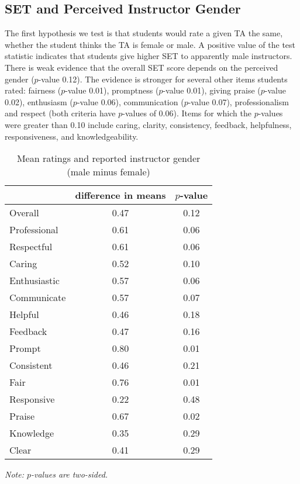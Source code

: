 \documentclass[12pt]{article}
\newcommand{\todo}[1]{{\color{red}{TO DO: \sc #1}}}
\begin{document}
\subsection{SET and Perceived Instructor Gender}
\todo{make sure the category names make sense in the prose}
The first hypothesis we test is that students would rate a given TA the same,
whether the student thinks the TA is female or male. 
A positive value of the test statistic indicates that students give higher SET
to apparently male instructors.
There is weak evidence that the overall SET score depends on the perceived gender ($p$-value 0.12). 
The evidence is stronger for several other items students rated: fairness ($p$-value 0.01), 
promptness ($p$-value 0.01), giving praise ($p$-value 0.02), 
enthusiasm ($p$-value 0.06), communication ($p$-value 0.07), professionalism and respect (both criteria have $p$-values of 0.06). 
Items for which the $p$-values were greater than 0.10 include caring, clarity,
consistency, feedback, helpfulness, responsiveness, and knowledgeability.

\begin{table}[htbp]
  \centering
  \footnotesize 
  \caption{Mean ratings and reported instructor gender (male minus female)}
    \begin{tabular}{lcc}
    \toprule 
                          & difference in means  & $p$-value  \\
   \midrule
    Overall &                 0.47       & 0.12   \\
    Professional &            0.61       & 0.06   \\
    Respectful			   &  0.61       & 0.06   \\
    Caring &                  0.52       & 0.10    \\
    Enthusiastic   &          0.57       & 0.06     \\
    Communicate        &      0.57       & 0.07     \\
    Helpful   &               0.46       & 0.18     \\
    Feedback   &              0.47       & 0.16     \\
    Prompt    &               0.80       & 0.01     \\
    Consistent   &            0.46       & 0.21     \\
    Fair   &                  0.76       & 0.01     \\
    Responsive   &            0.22       & 0.48     \\
    Praise   &                0.67       & 0.02     \\
    Knowledge   &             0.35       & 0.29     \\
    Clear   &                 0.41       & 0.29     \\
    \bottomrule
    \end{tabular}%
 \label{tab:macnell1}%
  
  \textit{Note: $p$-values are two-sided.}
\end{table}%
\normalsize
\end{document}
